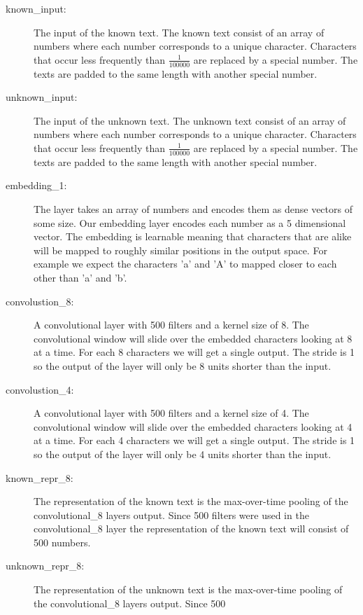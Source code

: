 \begin{description}
    \item[known\_input:] The input of the known text. The known text consist of
        an array of numbers where each number corresponds to a unique character.
        Characters that occur less frequently than $\frac{1}{100000}$ are
        replaced by a special number. The texts are padded to the same length
        with another special number.
    \item[unknown\_input:] The input of the unknown text. The unknown text
        consist of an array of numbers where each number corresponds to a unique
        character. Characters that occur less frequently than $\frac{1}{100000}$
        are replaced by a special number. The texts are padded to the same
        length with another special number.
    \item[embedding\_1:] The layer takes an array of numbers and encodes them as
        dense vectors of some size. Our embedding layer encodes each number as a
        5 dimensional vector. The embedding is learnable meaning that characters
        that are alike will be mapped to roughly similar positions in the output
        space. For example we expect the characters 'a' and 'A' to mapped closer
        to each other than 'a' and 'b'.
    \item[convolustion\_8:] A convolutional layer with 500 filters and a
        kernel size of 8. The convolutional window will slide over the embedded
        characters looking at 8 at a time. For each 8 characters we will get a
        single output. The stride is 1 so the output of the layer will only be
        8 units shorter than the input.
    \item[convolustion\_4:] A convolutional layer with 500 filters and a
        kernel size of 4. The convolutional window will slide over the embedded
        characters looking at 4 at a time. For each 4 characters we will get a
        single output. The stride is 1 so the output of the layer will only be
        4 units shorter than the input.
    \item[known\_repr\_8:] The representation of the known text is the
        max-over-time pooling of the convolutional\_8 layers output. Since 500
        filters were used in the convolutional\_8 layer the representation of
        the known text will consist of 500 numbers.
    \item[unknown\_repr\_8:] The representation of the unknown text is the
        max-over-time pooling of the convolutional\_8 layers output. Since 500

\end{description}
